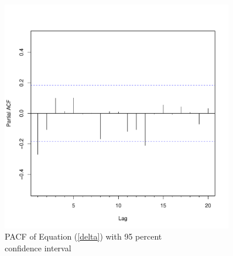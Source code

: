 \documentclass{paper}
\let\oldref\ref
\renewcommand{\ref}[1]{(\oldref{#1})}
\begin{document}
\begin{doublespacing}
\begin{figure}[H]
\begin{minipage}{0.5\textwidth}
        \includegraphics[width=0.9\textwidth]{pacfCon.pdf} %
        \caption{PACF of Equation \ref{delta} with 95 percent\\ confidence interval }\label{pCon}
    \end{minipage}
\end{figure}


\end{doublespacing}
\end{document}
